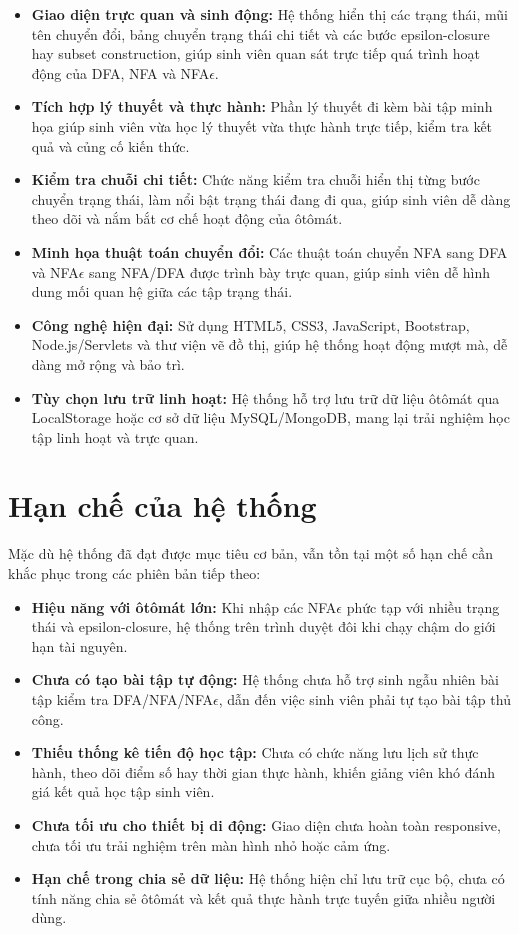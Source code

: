 \documentclass[12pt,a4paper]{report}
\begin{document}
\begin{itemize}
    \item \textbf{Giao diện trực quan và sinh động:} Hệ thống hiển thị các trạng thái, mũi tên chuyển đổi, bảng chuyển trạng thái chi tiết và các bước epsilon-closure hay subset construction, giúp sinh viên quan sát trực tiếp quá trình hoạt động của DFA, NFA và NFA$\epsilon$.
    \item \textbf{Tích hợp lý thuyết và thực hành:} Phần lý thuyết đi kèm bài tập minh họa giúp sinh viên vừa học lý thuyết vừa thực hành trực tiếp, kiểm tra kết quả và củng cố kiến thức.
    \item \textbf{Kiểm tra chuỗi chi tiết:} Chức năng kiểm tra chuỗi hiển thị từng bước chuyển trạng thái, làm nổi bật trạng thái đang đi qua, giúp sinh viên dễ dàng theo dõi và nắm bắt cơ chế hoạt động của ôtômát.
    \item \textbf{Minh họa thuật toán chuyển đổi:} Các thuật toán chuyển NFA sang DFA và NFA$\epsilon$ sang NFA/DFA được trình bày trực quan, giúp sinh viên dễ hình dung mối quan hệ giữa các tập trạng thái.
    \item \textbf{Công nghệ hiện đại:} Sử dụng HTML5, CSS3, JavaScript, Bootstrap, Node.js/Servlets và thư viện vẽ đồ thị, giúp hệ thống hoạt động mượt mà, dễ dàng mở rộng và bảo trì.
    \item \textbf{Tùy chọn lưu trữ linh hoạt:} Hệ thống hỗ trợ lưu trữ dữ liệu ôtômát qua LocalStorage hoặc cơ sở dữ liệu MySQL/MongoDB, mang lại trải nghiệm học tập linh hoạt và trực quan.
\end{itemize}

\section{Hạn chế của hệ thống}
Mặc dù hệ thống đã đạt được mục tiêu cơ bản, vẫn tồn tại một số hạn chế cần khắc phục trong các phiên bản tiếp theo:

\begin{itemize}
    \item \textbf{Hiệu năng với ôtômát lớn:} Khi nhập các NFA$\epsilon$ phức tạp với nhiều trạng thái và epsilon-closure, hệ thống trên trình duyệt đôi khi chạy chậm do giới hạn tài nguyên.
    \item \textbf{Chưa có tạo bài tập tự động:} Hệ thống chưa hỗ trợ sinh ngẫu nhiên bài tập kiểm tra DFA/NFA/NFA$\epsilon$, dẫn đến việc sinh viên phải tự tạo bài tập thủ công.
    \item \textbf{Thiếu thống kê tiến độ học tập:} Chưa có chức năng lưu lịch sử thực hành, theo dõi điểm số hay thời gian thực hành, khiến giảng viên khó đánh giá kết quả học tập sinh viên.
    \item \textbf{Chưa tối ưu cho thiết bị di động:} Giao diện chưa hoàn toàn responsive, chưa tối ưu trải nghiệm trên màn hình nhỏ hoặc cảm ứng.
    \item \textbf{Hạn chế trong chia sẻ dữ liệu:} Hệ thống hiện chỉ lưu trữ cục bộ, chưa có tính năng chia sẻ ôtômát và kết quả thực hành trực tuyến giữa nhiều người dùng.
\end{itemize}
\end{document}
